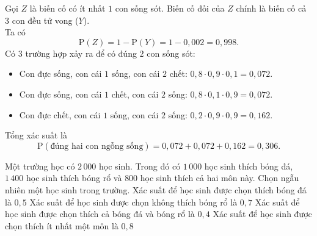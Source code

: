 \begin{ex}
{\begin{itemchoice}
			\itemch Gọi $Z$ là biến cố có ít nhất $1$ con sống sót. Biến cố đối của $Z$ chính là biến cố cả $3$ con đều tử vong ($Y$).\\
			Ta có
			\[\mathrm{P}(Z) = 1 - \mathrm{P}(Y) = 1 - 0{,}002 = 0{,}998.\]
			\itemch Có $3$ trường hợp xảy ra để có đúng $2$ con sống sót:
			\begin{itemize}
				\item Con đực sống, con cái $1$ sống, con cái $2$ chết: $0{,}8 \cdot 0{,}9 \cdot 0{,}1 = 0{,}072$.
				\item Con đực sống, con cái $1$ chết, con cái $2$ sống: $0{,}8 \cdot 0{,}1 \cdot 0{,}9 = 0{,}072$.
				\item Con đực chết, con cái $1$ sống, con cái $2$ sống: $0{,}2 \cdot 0{,}9 \cdot 0{,}9 = 0{,}162$.
			\end{itemize}
			Tổng xác suất là
			\[\mathrm{P}(\text{đúng hai con ngỗng sống}) = 0{,}072 + 0{,}072 + 0{,}162 = 0{,}306.\]
		\end{itemchoice}
	}
\end{ex}

\begin{ex}%
	Một trường học có $2\,000$ học sinh. Trong đó có $1\,000$ học sinh thích bóng đá, $1\,400$ học sinh thích bóng rổ và $800$ học sinh thích cả hai môn này. Chọn ngẫu nhiên một học sinh trong trường.
	\choiceTF
	{\True Xác suất để học sinh được chọn thích bóng đá là $0{,}5$}
	{Xác suất để học sinh được chọn không thích bóng rổ là $0{,}7$}
	{\True Xác suất để học sinh được chọn thích cả bóng đá và bóng rổ là $0{,}4$}
	{\True Xác suất để học sinh được chọn thích ít nhất một môn là $0{,}8$}
\end{ex}

